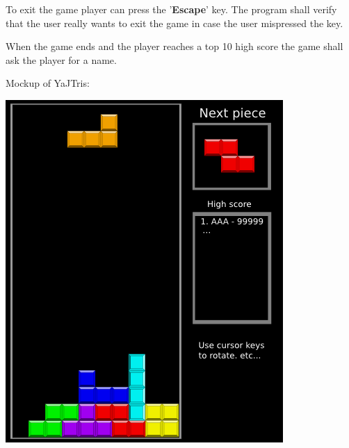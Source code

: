\documentclass[11pt,a4paper]{article}
\begin{document}
To exit the game player can press the '{\bf Escape}' key. The program shall verify that the
user really wants to exit the game in case the user mispressed the key.

When the game ends and the player reaches a top 10 high score the game shall ask the player for a name.

\vspace{3mm}
Mockup of YaJTris:
\begin{center}
\includegraphics[scale=0.5]{tetris_mockup.png}
\end{center}
\end{document}
